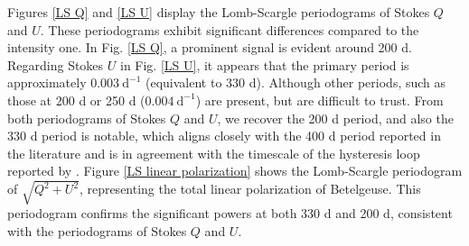 \documentclass{aa}
\begin{document}
Figures \ref{LS Q} and \ref{LS U} display the Lomb-Scargle periodograms of Stokes $Q$ and $U$. These periodograms exhibit significant differences compared to the intensity one. In Fig. \ref{LS Q}, a prominent signal is evident around 200 d. Regarding Stokes $U$ in Fig. \ref{LS U}, it appears that the primary period is approximately $0.003 \ \mathrm{d^{-1}}$ (equivalent to 330 d). Although other periods, such as those at 200 d or 250 d ($0.004 \ \mathrm{d^{-1}}$) are present, but are difficult to trust. From both periodograms of Stokes $Q$ and $U$, we recover the 200 d period, and also the 330 d period is notable, which aligns closely with the 400 d period reported in the literature and is in agreement with the timescale of the hysteresis loop reported by \cite{kravchenko_tomography_2019}.  
Figure \ref{LS linear polarization} shows the Lomb-Scargle periodogram of $\sqrt{Q^2+U^2}$, representing the total linear polarization of Betelgeuse. 
This periodogram confirms the significant powers at both 330 d and 200 d, consistent with the periodograms of Stokes $Q$ and $U$. 


\end{document}
